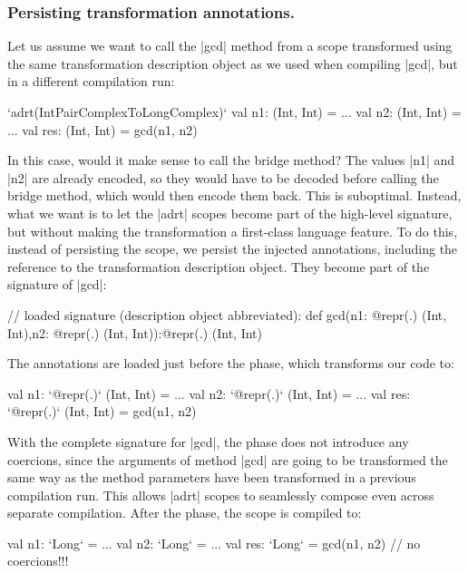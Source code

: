 \subsubsection{Persisting transformation annotations.} Let us assume we want to call the |gcd| method from a scope transformed using the same transformation description object as we used when compiling |gcd|, but in a different compilation run:

\begin{lstlisting-nobreak}
`adrt(IntPairComplexToLongComplex)` {
  val n1: (Int, Int) = ...
  val n2: (Int, Int) = ...
  val res: (Int, Int) = gcd(n1, n2)
}
\end{lstlisting-nobreak}

In this case, would it make sense to call the bridge method? The values |n1| and |n2| are already encoded, so they would have to be decoded before calling the bridge method, which would then encode them back. This is suboptimal. Instead, what we want is to let the |adrt| scopes become part of the high-level signature, but without making the transformation a first-class language feature. To do this, instead of persisting the scope, we persist the injected annotations, including the reference to the transformation description object. They become part of the signature of |gcd|: %

\begin{lstlisting-nobreak}
// loaded signature (description object abbreviated):
def gcd(n1: @repr(.) (Int, Int),n2: @repr(.) (Int, Int)):@repr(.) (Int, Int)
\end{lstlisting-nobreak}

The annotations are loaded just before the \inject{} phase, which transforms our code to:

\begin{lstlisting-nobreak}
val n1: `@repr(.)` (Int, Int) = ...
val n2: `@repr(.)` (Int, Int) = ...
val res: `@repr(.)` (Int, Int) = gcd(n1, n2)
\end{lstlisting-nobreak}

With the complete signature for |gcd|, the \coerce{} phase does not introduce any coercions, since the arguments of method |gcd| are going to be transformed the same way as the method parameters have been transformed in a previous compilation run. This allows |adrt| scopes to seamlessly compose even across separate compilation. After the \commit{} phase, the scope is compiled to:

\begin{lstlisting-nobreak}
val n1: `Long` = ...
val n2: `Long` = ...
val res: `Long` = gcd(n1, n2) // no coercions!!!
\end{lstlisting-nobreak}

